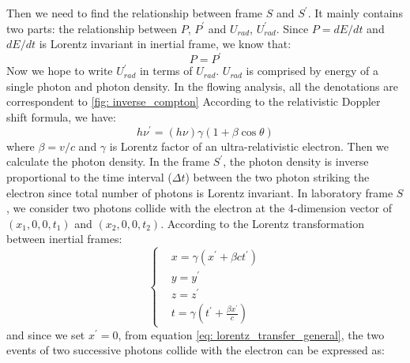\documentclass[12pt]{report}
\begin{document}
            Then we need to find the relationship between frame $S$ and $S^{\prime}$. It mainly contains two
            parts: the relationship between $P$, $P^{\prime}$ and $U_{rad}$, $U_{rad}^{\prime}$. Since 
            $P = dE/dt$ and $dE/dt$ is Lorentz invariant in inertial frame, we know that: 
            \begin{equation}
              \label{eq: power_is_equal}
              P = P^{\prime}
            \end{equation}
            Now we hope to write $U_{rad}^{\prime}$ in terms of $U_{rad}$. $U_{rad}$ is comprised by 
            energy of a single photon and photon density. In the flowing analysis, all the denotations are 
            correspondent to \ref{fig: inverse_compton} According to the relativistic Doppler shift formula,
            we have: 
            \begin{equation}
              \label{eq: doppler_shift}
              h \nu^{\prime} = \left(h \nu\right) \gamma \left(1 + \beta \cos{\theta} \right)
            \end{equation}
            where $\beta = v / c$ and $\gamma$ is Lorentz factor of an ultra-relativistic electron. 
            Then we calculate the photon density. In the frame $S^{\prime}$, the photon density is
            inverse proportional to the time interval ($\Delta t$) between the two photon striking the electron 
            since total number of photons is Lorentz invariant. In laboratory frame $S$, 
            we consider two photons collide with the electron at the 4-dimension vector of 
            $\left(x_{1}, 0, 0, t_{1}\right)$ and $\left(x_{2}, 0, 0, t_{2}\right)$. According to the 
            Lorentz transformation between inertial frames: 
            \begin{equation}
              \label{eq: lorentz_transfer_general}
                \begin{cases}
                  & x = \gamma \left( x^{\prime} + \beta c t^{\prime} \right)\\
                  & y = y^{\prime} \\
                  & z = z^{\prime} \\ 
                  & t = \gamma \left(t^{\prime} + \frac{\beta x^{\prime}}{c}\right)
                \end{cases}       
            \end{equation}
            and since we set $x^{\prime} = 0$, from equation \ref{eq: lorentz_transfer_general}, the two 
            events of two successive photons collide with the electron can be expressed as:
\end{document}
